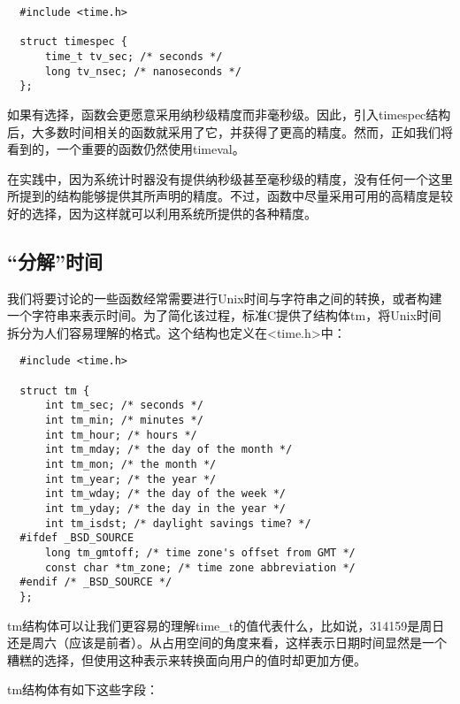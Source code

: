 \begin{lstlisting}
  #include <time.h>

  struct timespec {
      time_t tv_sec; /* seconds */
      long tv_nsec; /* nanoseconds */
  };
\end{lstlisting}

如果有选择，函数会更愿意采用纳秒级精度而非毫秒级。因此，引入timespec结构后，大多数时间相关的函数就采用了它，并获得了更高的精度。然而，正如我们将看到的，一个重要的函数仍然使用timeval。

在实践中，因为系统计时器没有提供纳秒级甚至毫秒级的精度，没有任何一个这里所提到的结构能够提供其所声明的精度。不过，函数中尽量采用可用的高精度是较好的选择，因为这样就可以利用系统所提供的各种精度。

\subsection{“分解”时间}

我们将要讨论的一些函数经常需要进行Unix时间与字符串之间的转换，或者构建一个字符串来表示时间。为了简化该过程，标准C提供了结构体tm，将Unix时间拆分为人们容易理解的格式。这个结构也定义在<time.h>中： 

\begin{lstlisting}
  #include <time.h>

  struct tm {
      int tm_sec; /* seconds */
      int tm_min; /* minutes */
      int tm_hour; /* hours */
      int tm_mday; /* the day of the month */
      int tm_mon; /* the month */
      int tm_year; /* the year */
      int tm_wday; /* the day of the week */
      int tm_yday; /* the day in the year */
      int tm_isdst; /* daylight savings time? */
  #ifdef _BSD_SOURCE
      long tm_gmtoff; /* time zone's offset from GMT */
      const char *tm_zone; /* time zone abbreviation */
  #endif /* _BSD_SOURCE */
  };
\end{lstlisting}

tm结构体可以让我们更容易的理解time\_t的值代表什么，比如说，314159是周日还是周六（应该是前者）。从占用空间的角度来看，这样表示日期时间显然是一个糟糕的选择，但使用这种表示来转换面向用户的值时却更加方便。

tm结构体有如下这些字段： 

